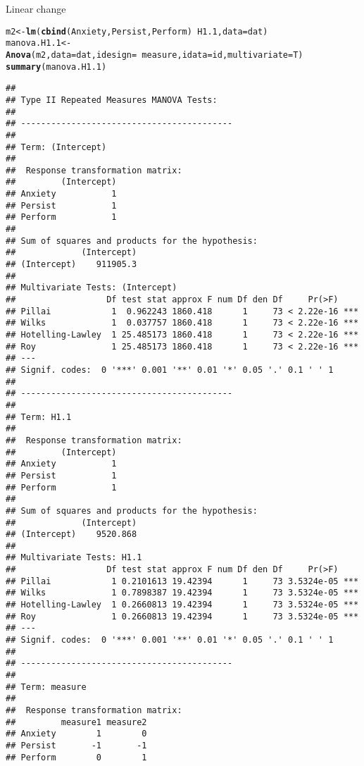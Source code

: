 \documentclass{article}\usepackage[]{graphicx}\usepackage[]{color}
\makeatletter
\newcommand{\hlopt}[1]{\textcolor[rgb]{0,0,0}{#1}}%
\newcommand{\hlstd}[1]{\textcolor[rgb]{0.345,0.345,0.345}{#1}}%
\newcommand{\hlkwb}[1]{\textcolor[rgb]{0.69,0.353,0.396}{#1}}%
\newcommand{\hlkwc}[1]{\textcolor[rgb]{0.333,0.667,0.333}{#1}}%
\newcommand{\hlkwd}[1]{\textcolor[rgb]{0.737,0.353,0.396}{\textbf{#1}}}%
\newenvironment{kframe}{%
 \def\at@end@of@kframe{}%
 \ifinner\ifhmode%
  \def\at@end@of@kframe{\end{minipage}}%
  \begin{minipage}{\columnwidth}%
 \fi\fi%
 \def\FrameCommand##1{\hskip\@totalleftmargin \hskip-\fboxsep
 \colorbox{shadecolor}{##1}\hskip-\fboxsep
     \hskip-\linewidth \hskip-\@totalleftmargin \hskip\columnwidth}%
 \MakeFramed {\advance\hsize-\width
   \@totalleftmargin\z@ \linewidth\hsize
   \@setminipage}}%
 {\par\unskip\endMakeFramed%
 \at@end@of@kframe}
\newenvironment{knitrout}{}{} %
\makeatother
\begin{document}
Linear change

\begin{knitrout}
\color{fgcolor}\begin{kframe}
\begin{alltt}
\hlstd{m2} \hlkwb{<-} \hlkwd{lm}\hlstd{(}\hlkwd{cbind}\hlstd{(Anxiety, Persist, Perform)} \hlopt{~} \hlstd{H1.1,} \hlkwc{data} \hlstd{= dat)}
\hlstd{manova.H1.1} \hlkwb{<-} \hlkwd{Anova}\hlstd{(m2,} \hlkwc{data} \hlstd{= dat,} \hlkwc{idesign} \hlstd{=} \hlopt{~}\hlstd{measure,} \hlkwc{idata} \hlstd{= id,} \hlkwc{multivariate} \hlstd{= T)}
\hlkwd{summary}\hlstd{(manova.H1.1)}
\end{alltt}
\begin{verbatim}
## 
## Type II Repeated Measures MANOVA Tests:
## 
## ------------------------------------------
##  
## Term: (Intercept) 
## 
##  Response transformation matrix:
##         (Intercept)
## Anxiety           1
## Persist           1
## Perform           1
## 
## Sum of squares and products for the hypothesis:
##             (Intercept)
## (Intercept)    911905.3
## 
## Multivariate Tests: (Intercept)
##                  Df test stat approx F num Df den Df     Pr(>F)    
## Pillai            1  0.962243 1860.418      1     73 < 2.22e-16 ***
## Wilks             1  0.037757 1860.418      1     73 < 2.22e-16 ***
## Hotelling-Lawley  1 25.485173 1860.418      1     73 < 2.22e-16 ***
## Roy               1 25.485173 1860.418      1     73 < 2.22e-16 ***
## ---
## Signif. codes:  0 '***' 0.001 '**' 0.01 '*' 0.05 '.' 0.1 ' ' 1
## 
## ------------------------------------------
##  
## Term: H1.1 
## 
##  Response transformation matrix:
##         (Intercept)
## Anxiety           1
## Persist           1
## Perform           1
## 
## Sum of squares and products for the hypothesis:
##             (Intercept)
## (Intercept)    9520.868
## 
## Multivariate Tests: H1.1
##                  Df test stat approx F num Df den Df     Pr(>F)    
## Pillai            1 0.2101613 19.42394      1     73 3.5324e-05 ***
## Wilks             1 0.7898387 19.42394      1     73 3.5324e-05 ***
## Hotelling-Lawley  1 0.2660813 19.42394      1     73 3.5324e-05 ***
## Roy               1 0.2660813 19.42394      1     73 3.5324e-05 ***
## ---
## Signif. codes:  0 '***' 0.001 '**' 0.01 '*' 0.05 '.' 0.1 ' ' 1
## 
## ------------------------------------------
##  
## Term: measure 
## 
##  Response transformation matrix:
##         measure1 measure2
## Anxiety        1        0
## Persist       -1       -1
## Perform        0        1

\end{verbatim}
\end{kframe}
\end{knitrout}
\end{document}
